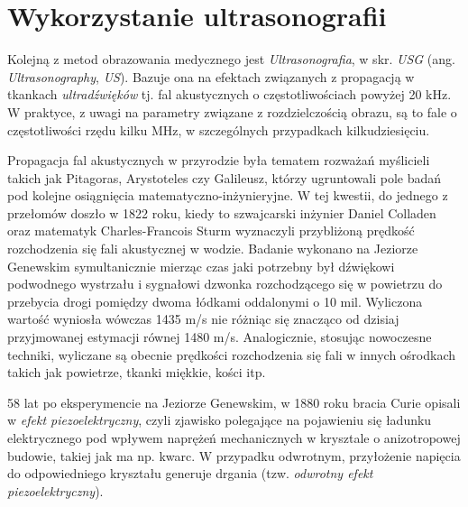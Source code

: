 \section{Wykorzystanie ultrasonografii}
\label{USG}

Kolejną z metod obrazowania medycznego jest \textit{Ultrasonografia}, w skr. \textit{USG} (ang. \textit{Ultrasonography}, \textit{US}). Bazuje ona na efektach związanych z propagacją w tkankach \textit{ultradźwięków} tj. fal akustycznych o częstotliwościach powyżej 20 kHz. W praktyce, z uwagi na parametry związane z rozdzielczością obrazu, są to fale o częstotliwości rzędu kilku MHz, w szczególnych przypadkach kilkudziesięciu.

Propagacja fal akustycznych w przyrodzie była tematem rozważań myślicieli takich jak Pitagoras, Arystoteles czy Galileusz, którzy ugruntowali pole badań pod kolejne osiągnięcia matematyczno-inżynieryjne. W tej kwestii, do jednego z przełomów doszło w 1822 roku, kiedy to szwajcarski inżynier Daniel Colladen oraz matematyk Charles-Francois Sturm wyznaczyli przybliżoną prędkość rozchodzenia się fali akustycznej w wodzie. Badanie wykonano na Jeziorze Genewskim symultanicznie mierząc czas jaki potrzebny był dźwiękowi podwodnego wystrzału i sygnałowi dzwonka rozchodzącego się w powietrzu do przebycia drogi pomiędzy dwoma łódkami oddalonymi o 10 mil. Wyliczona wartość wyniosła wówczas 1435 m/s nie różniąc się znacząco od dzisiaj przyjmowanej estymacji równej 1480 m/s. Analogicznie, stosując nowoczesne techniki, wyliczane są obecnie prędkości rozchodzenia się fali \linebreak w innych ośrodkach takich jak powietrze, tkanki miękkie, kości itp.

58 lat po eksperymencie na Jeziorze Genewskim, w 1880 roku bracia Curie opisali w \cite{Curie1880} \textit{efekt piezoelektryczny}, czyli zjawisko polegające na pojawieniu się ładunku elektrycznego pod wpływem naprężeń mechanicznych w krysztale o anizotropowej budowie, takiej jak ma np. kwarc. W przypadku odwrotnym, przyłożenie napięcia do odpowiedniego kryształu generuje drgania (tzw. \textit{odwrotny efekt piezoelektryczny}). 

